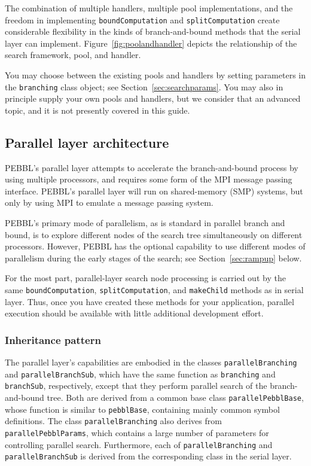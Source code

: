 The combination of multiple handlers, multiple pool implementations,
and the freedom in implementing \texttt{boundComputation} and
\texttt{splitComputation} create considerable flexibility in the kinds
of branch-and-bound methods that the serial layer can implement.
Figure~\ref{fig:poolandhandler} depicts the relationship of the search
framework, pool, and handler.

You may choose between the existing pools and handlers by setting
parameters in the \texttt{branching} class object; see
Section~\ref{sec:searchparams}.  You may also in principle supply
your own pools and handlers, but we consider that an advanced topic,
and it is not presently covered in this guide.


\subsection{Parallel layer architecture}

PEBBL's parallel layer attempts to accelerate the branch-and-bound
process by using multiple processors, and requires some form of the
MPI message passing interface.  PEBBL's parallel layer will run on
shared-memory (SMP) systems, but only by using MPI to emulate a
message passing system.  

PEBBL's primary mode of parallelism, as is standard in parallel branch
and bound, is to explore different nodes of the search tree
simultaneously on different processors.  However, PEBBL has the
optional capability to use different modes of parallelism during the
early stages of the search; see Section~\ref{sec:rampup} below.

For the most part, parallel-layer search node processing is carried
out by the same \texttt{boundComputation}, \texttt{splitComputation},
and \texttt{makeChild} methods as in serial layer.  Thus, once you
have created these methods for your application, parallel execution
should be available with little additional development effort.


\subsubsection{Inheritance pattern}

The parallel layer's capabilities are embodied in the classes
\texttt{parallelBranching} and {\tt paral\-lel\-BranchSub}, which have the
same function as \texttt{branching} and \texttt{branchSub},
respectively, except that they perform parallel search of the
branch-and-bound tree.  Both are derived from a common base
class \texttt{parallelPebblBase}, whose function is similar to
\texttt{pebblBase}, containing mainly common symbol definitions.
The class \texttt{parallelBranching} also derives from
\texttt{parallelPebblParams}, which contains a large number of
parameters for controlling parallel search.  Furthermore, each of
\texttt{parallelBranching} and {\tt parallelBranchSub} is derived from
the corresponding class in the serial layer.


